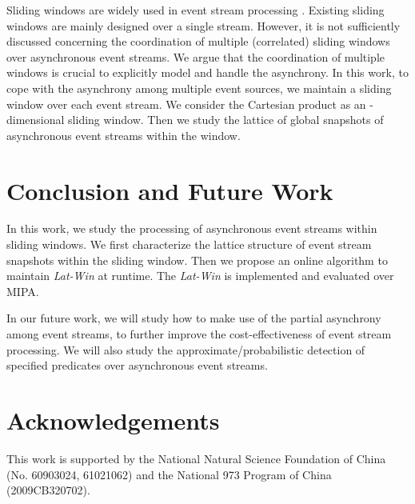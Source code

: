\documentclass[12pt,journal,letterpaper,compsoc]{IEEEtran}
\begin{document}
Sliding windows are widely used in event stream processing \cite{Babcock02, Braverman11, Datar02, Tirthapura06}. Existing sliding windows are mainly designed over a single stream. However, it is not sufficiently discussed concerning the coordination of multiple (correlated) sliding windows over asynchronous event streams. We argue that the coordination of multiple windows is crucial to explicitly model and handle the asynchrony. In this work, to cope with the asynchrony among multiple event sources, we maintain a sliding window over each event stream. We consider the Cartesian product as an -dimensional sliding window. Then we study the lattice of global snapshots of asynchronous event streams within the window.

\section{Conclusion and Future Work}
\label{sec:conclusion}

In this work, we study the processing of asynchronous event streams within sliding windows. We first characterize the lattice structure of event stream snapshots within the sliding window. Then we propose an online algorithm to maintain {\it Lat-Win} at runtime. The {\it Lat-Win} is implemented and evaluated over MIPA.

In our future work, we will study how to make use of the partial asynchrony among event streams, to further improve the cost-effectiveness of event stream processing. We will also study the approximate/probabilistic detection of specified predicates over asynchronous event streams.

\section*{Acknowledgements}

This work is supported by the National Natural Science Foundation of China (No. 60903024, 61021062) and the National 973 Program of China (2009CB320702).



\end{document}
